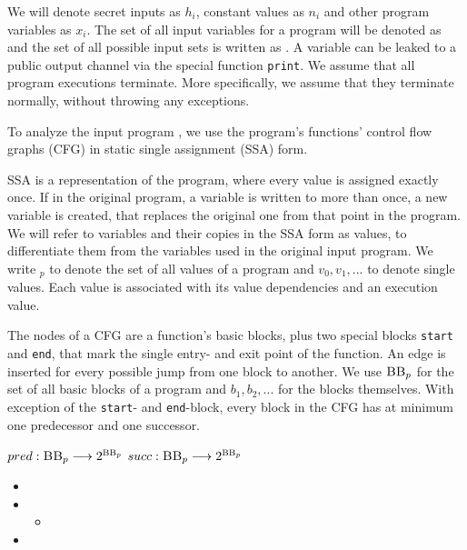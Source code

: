 We will denote secret inputs as $h_i$, constant values as $n_i$ and other program variables as $x_i$. The set of all input variables for a program will be denoted as \In and the set of all possible input sets is written as \allIn. A variable can be leaked to a public output channel via the special function \texttt{print}. We assume that all program executions terminate. More specifically, we assume that they terminate normally, without throwing any exceptions.

To analyze the input program \p, we use the program's functions' control flow graphs (CFG) in static single assignment (SSA) form.  

SSA is a representation of the program, where every value is assigned exactly once. If in the original program, a variable is written to more than once, a new variable is created, that replaces the original one from that point in the program. We will refer to variables and their copies in the SSA form as values, to differentiate them from the variables used in the original input program.
We write \val$_p$ to denote the set of all values of a program and $v_0, v_1, ...$ to denote single values. Each value is associated with its value dependencies and an execution value. 

The nodes of a CFG are a function's basic blocks, plus two special blocks \texttt{start} and \texttt{end}, that mark the single entry- and exit point of the function. An edge is inserted for every possible jump from one block to another. We use $\mbb_p$ for the set of all basic blocks of a program \p and $b_1, b_2, ...$ for the blocks themselves.
With exception of the \texttt{start}- and \texttt{end}-block, every block in the CFG has at minimum one predecessor and one successor.

\begin{definition}
    \begin{center}
        $pred: \textsc{BB}_p \longrightarrow 2^{\textsc{BB}_p}$
        $succ: \textsc{BB}_p \longrightarrow 2^{\textsc{BB}_p}$
    \end{center}
\end{definition}

\begin{itemize}
    \item {}
    \item {}
    \begin{itemize}
        \item {}
    \end{itemize}
    \item {}
\end{itemize}

